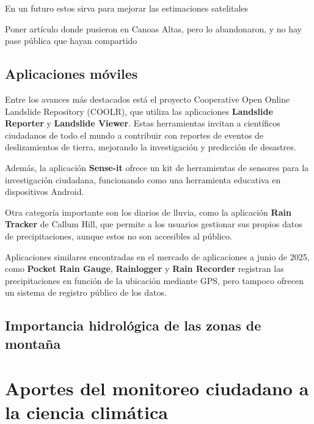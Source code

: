 En un futuro estos sirva para mejorar las estimaciones satelitales

Poner artículo donde pusieron en Canoas Altas, pero lo abandonaron, y no hay pase pública que hayan compartido


\subsection{Aplicaciones móviles}

Entre los avances más destacados está el proyecto Cooperative Open Online Landslide Repository (COOLR), que utiliza las aplicaciones \textbf{Landslide Reporter} y \textbf{Landslide Viewer}. Estas herramientas invitan a científicos ciudadanos de todo el mundo a contribuir con reportes de eventos de deslizamientos de tierra, mejorando la investigación y predicción de desastres.\cite{coolr2021} 

Además, la aplicación \textbf{Sense-it} ofrece un kit de herramientas de sensores para la investigación ciudadana, funcionando como una herramienta educativa en dispositivos Android.\cite{van2017senseit}


Otra categoría importante son los diarios de lluvia, como la aplicación \textbf{Rain Tracker} de Callum Hill, que permite a los usuarios gestionar sus propios datos de precipitaciones, aunque estos no son accesibles al público. \cite{hill2021raintracker}

Aplicaciones similares encontradas en el mercado de aplicaciones a junio de 2025, como \textbf{Pocket Rain Gauge}, \textbf{Rainlogger} y \textbf{Rain Recorder} registran las precipitaciones en función de la ubicación mediante GPS, pero tampoco ofrecen un sistema de registro público de los datos.


\subsection{Importancia hidrológica de las zonas de montaña}











\newpage
\section{Aportes del monitoreo ciudadano a la ciencia climática}



